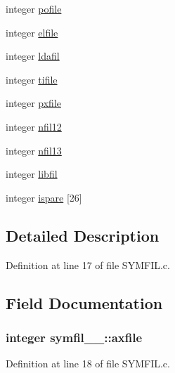 \begin{DoxyCompactItemize}
\item 
integer \hyperlink{structsymfil__1___a9436e5c881175ad1541c9d1258b2acb7}{pofile}
\item 
integer \hyperlink{structsymfil__1___afbb4371a25fc62d76506e98d02edaa2f}{elfile}
\item 
integer \hyperlink{structsymfil__1___a97356b7e71b6284bda26988d94923827}{ldafil}
\item 
integer \hyperlink{structsymfil__1___acbf3582bafc9b5d4cce43c942c382a50}{tifile}
\item 
integer \hyperlink{structsymfil__1___ac5b3109516e632236038df08884d485e}{pxfile}
\item 
integer \hyperlink{structsymfil__1___a39f80c3a07ad0f918875117c9c87cbec}{nfil12}
\item 
integer \hyperlink{structsymfil__1___a73ff15df000236c1178ce042b7f06cda}{nfil13}
\item 
integer \hyperlink{structsymfil__1___a6be01312ddbaea99504000f133539faa}{libfil}
\item 
integer \hyperlink{structsymfil__1___a6ef7d9acc381f44f170506c70924d7da}{ispare} \mbox{[}26\mbox{]}
\end{DoxyCompactItemize}


\subsection{Detailed Description}


Definition at line 17 of file S\+Y\+M\+F\+I\+L.\+c.



\subsection{Field Documentation}
\subsubsection[{\texorpdfstring{axfile}{axfile}}]{\setlength{\rightskip}{0pt plus 5cm}integer symfil\+\_\+\_\+\+::axfile}\hypertarget{structsymfil__1___a0d8876710542d9ce037cedfe6d501d23}{}\label{structsymfil__1___a0d8876710542d9ce037cedfe6d501d23}


Definition at line 18 of file S\+Y\+M\+F\+I\+L.\+c.

